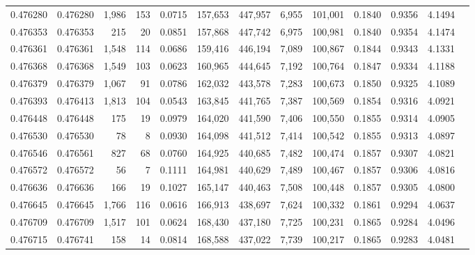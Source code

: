 \begin{tabular}{rrrrrrrrrrrrr}
0.476280 & 0.476280 & 1,986 &   153 &                                     0.0715 & 157,653 & 447,957 &   6,955 & 101,001 & 0.1840 & 0.9356 & 4.1494 \\
0.476353 & 0.476353 &   215 &    20 &                                     0.0851 & 157,868 & 447,742 &   6,975 & 100,981 & 0.1840 & 0.9354 & 4.1474 \\
0.476361 & 0.476361 & 1,548 &   114 &                                     0.0686 & 159,416 & 446,194 &   7,089 & 100,867 & 0.1844 & 0.9343 & 4.1331 \\
0.476368 & 0.476368 & 1,549 &   103 &                                     0.0623 & 160,965 & 444,645 &   7,192 & 100,764 & 0.1847 & 0.9334 & 4.1188 \\
0.476379 & 0.476379 & 1,067 &    91 &                                     0.0786 & 162,032 & 443,578 &   7,283 & 100,673 & 0.1850 & 0.9325 & 4.1089 \\
0.476393 & 0.476413 & 1,813 &   104 &                                     0.0543 & 163,845 & 441,765 &   7,387 & 100,569 & 0.1854 & 0.9316 & 4.0921 \\
0.476448 & 0.476448 &   175 &    19 &                                     0.0979 & 164,020 & 441,590 &   7,406 & 100,550 & 0.1855 & 0.9314 & 4.0905 \\
0.476530 & 0.476530 &    78 &     8 &                                     0.0930 & 164,098 & 441,512 &   7,414 & 100,542 & 0.1855 & 0.9313 & 4.0897 \\
0.476546 & 0.476561 &   827 &    68 &                                     0.0760 & 164,925 & 440,685 &   7,482 & 100,474 & 0.1857 & 0.9307 & 4.0821 \\
0.476572 & 0.476572 &    56 &     7 &                                     0.1111 & 164,981 & 440,629 &   7,489 & 100,467 & 0.1857 & 0.9306 & 4.0816 \\
0.476636 & 0.476636 &   166 &    19 &                                     0.1027 & 165,147 & 440,463 &   7,508 & 100,448 & 0.1857 & 0.9305 & 4.0800 \\
0.476645 & 0.476645 & 1,766 &   116 &                                     0.0616 & 166,913 & 438,697 &   7,624 & 100,332 & 0.1861 & 0.9294 & 4.0637 \\
0.476709 & 0.476709 & 1,517 &   101 &                                     0.0624 & 168,430 & 437,180 &   7,725 & 100,231 & 0.1865 & 0.9284 & 4.0496 \\
0.476715 & 0.476741 &   158 &    14 &                                     0.0814 & 168,588 & 437,022 &   7,739 & 100,217 & 0.1865 & 0.9283 & 4.0481 \\

\end{tabular}
